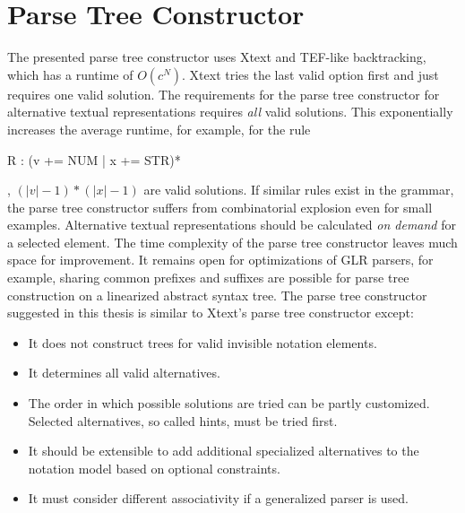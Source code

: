 \section{Parse Tree Constructor}
The presented parse tree constructor uses Xtext and TEF-like backtracking, which has a runtime of $O(c^N)$. Xtext tries the last valid option first and just requires one valid solution. The requirements for the parse tree constructor for alternative textual representations requires \emph{all} valid solutions. This exponentially increases the average runtime, for example, for the rule
\begin{xtxt}
R : (v += NUM | x += STR)*
\end{xtxt}, $( |v| - 1 ) * ( |x| - 1)$ are valid solutions. If similar rules exist in the grammar, the parse tree constructor suffers from combinatorial explosion even for small examples.  Alternative textual representations should be calculated \emph{on demand} for a selected element. The time complexity of the parse tree constructor leaves much space for improvement. It remains open for optimizations of GLR parsers, for example, sharing common prefixes and suffixes are possible for parse tree construction on a linearized abstract syntax tree. The parse tree constructor suggested in this thesis is similar to Xtext's parse tree constructor except:
\begin{itemize}
	\item It does not construct trees for valid invisible notation elements.
	\item It determines all valid alternatives.
	\item The order in which possible solutions are tried can be partly customized. Selected alternatives, so called hints, must be tried first.
	\item It should be extensible to add additional specialized alternatives to the notation model based on optional constraints.
	\item It must consider different associativity if a generalized parser is used.
\end{itemize}

